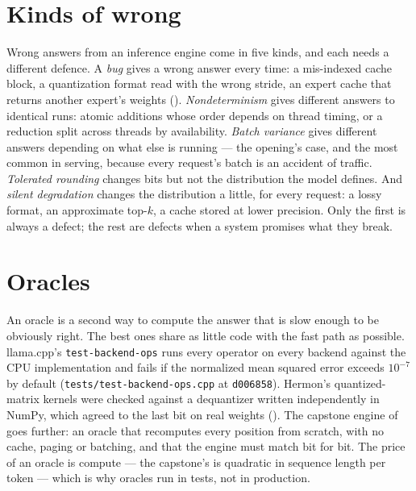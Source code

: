 
\section{Kinds of wrong}

Wrong answers from an inference engine come in five kinds, and each needs a
different defence. A \emph{bug} gives a wrong answer every time: a mis-indexed
cache block, a quantization format read with the wrong stride, an expert cache
that returns another expert's weights ().
\emph{Nondeterminism} gives different answers to identical runs: atomic
additions whose order depends on thread timing, or a reduction split across
threads by availability. \emph{Batch variance} gives different answers
depending on what else is running --- the opening's case, and the most common
in serving, because every request's batch is an accident of traffic.
\emph{Tolerated rounding} changes bits but not the distribution the model
defines. And \emph{silent degradation} changes the distribution a little, for
every request: a lossy format, an approximate top-$k$, a cache stored at lower
precision. Only the first is always a defect; the rest are defects when a
system promises what they break.

\section{Oracles}

An oracle is a second way to compute the answer that is slow enough to be
obviously right. The best ones share as little code with the fast path as
possible. llama.cpp's \texttt{test-backend-ops} runs every operator on every
backend against the CPU implementation and fails if the normalized mean squared
error exceeds $10^{-7}$ by default (\texttt{tests/test-backend-ops.cpp} at
\texttt{d006858}). Hermon's quantized-matrix kernels were checked against a
dequantizer written independently in NumPy, which agreed to the last bit on
real weights (). The capstone engine of
 goes further: an oracle that recomputes every position from
scratch, with no cache, paging or batching, and that the engine must match bit
for bit. The price of an oracle is compute --- the capstone's is quadratic in
sequence length per token --- which is why oracles run in tests, not in
production.

